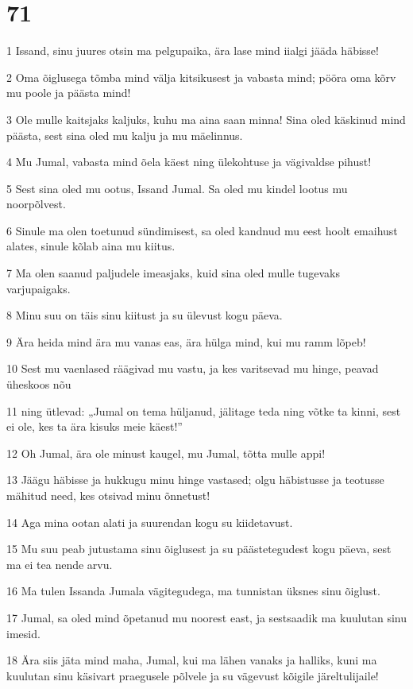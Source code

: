 \chapter{71}

\par 1 Issand, sinu juures otsin ma pelgupaika, ära lase mind iialgi jääda häbisse!
\par 2 Oma õiglusega tõmba mind välja kitsikusest ja vabasta mind; pööra oma kõrv mu poole ja päästa mind!
\par 3 Ole mulle kaitsjaks kaljuks, kuhu ma aina saan minna! Sina oled käskinud mind päästa, sest sina oled mu kalju ja mu mäelinnus.
\par 4 Mu Jumal, vabasta mind õela käest ning ülekohtuse ja vägivaldse pihust!
\par 5 Sest sina oled mu ootus, Issand Jumal. Sa oled mu kindel lootus mu noorpõlvest.
\par 6 Sinule ma olen toetunud sündimisest, sa oled kandnud mu eest hoolt emaihust alates, sinule kõlab aina mu kiitus.
\par 7 Ma olen saanud paljudele imeasjaks, kuid sina oled mulle tugevaks varjupaigaks.
\par 8 Minu suu on täis sinu kiitust ja su ülevust kogu päeva.
\par 9 Ära heida mind ära mu vanas eas, ära hülga mind, kui mu ramm lõpeb!
\par 10 Sest mu vaenlased räägivad mu vastu, ja kes varitsevad mu hinge, peavad üheskoos nõu
\par 11 ning ütlevad: „Jumal on tema hüljanud, jälitage teda ning võtke ta kinni, sest ei ole, kes ta ära kisuks meie käest!”
\par 12 Oh Jumal, ära ole minust kaugel, mu Jumal, tõtta mulle appi!
\par 13 Jäägu häbisse ja hukkugu minu hinge vastased; olgu häbistusse ja teotusse mähitud need, kes otsivad minu õnnetust!
\par 14 Aga mina ootan alati ja suurendan kogu su kiidetavust.
\par 15 Mu suu peab jutustama sinu õiglusest ja su päästetegudest kogu päeva, sest ma ei tea nende arvu.
\par 16 Ma tulen Issanda Jumala vägitegudega, ma tunnistan üksnes sinu õiglust.
\par 17 Jumal, sa oled mind õpetanud mu noorest east, ja sestsaadik ma kuulutan sinu imesid.
\par 18 Ära siis jäta mind maha, Jumal, kui ma lähen vanaks ja halliks, kuni ma kuulutan sinu käsivart praegusele põlvele ja su vägevust kõigile järeltulijaile!
